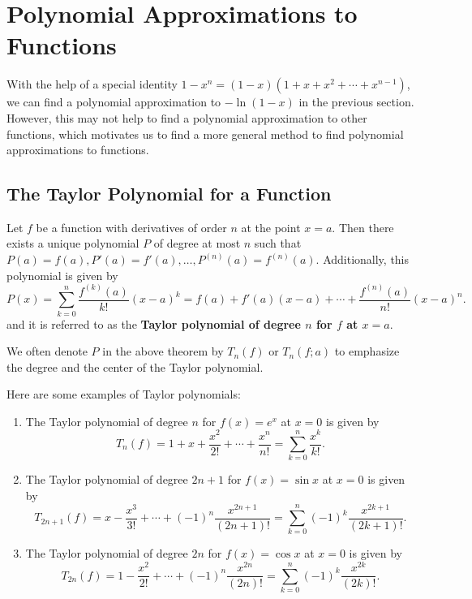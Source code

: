     \chapter{Polynomial Approximations to Functions}
    With the help of a special identity $1-x^n = (1-x)(1+x+x^2+\cdots + x^{n-1})$, we can find a polynomial approximation to $-\ln(1-x)$ in the previous section. However, this may not help to find a polynomial approximation to other functions, which motivates us to find a more general method to find polynomial approximations to functions.
    \section{The Taylor Polynomial for a Function}
    \begin{theoremenv}
        Let $f$ be a function with derivatives of order $n$ at the point $x=a$. Then there exists a unique polynomial $P$ of degree at most $n$ such that $P(a)=f(a), P'(a)=f'(a), \ldots, P^{(n)}(a) = f^{(n)}(a)$. Additionally, this polynomial is given by
        \[
        P(x) = \sum_{k=0}^n \frac{f^{(k)}(a)}{k!} (x-a)^k = f(a) + f'(a)(x-a) + \cdots + \frac{f^{(n)}(a)}{n!} (x-a)^n.
        \]
        and it is referred to as the \textbf{Taylor polynomial of degree $n$ for $f$ at $x=a$}.
    \end{theoremenv}
    \begin{notationenv}
        We often denote $P$ in the above theorem by $T_n(f)$ or $T_n(f;a)$ to emphasize the degree and the center of the Taylor polynomial.
    \end{notationenv}
    \begin{exampleenv}
        Here are some examples of Taylor polynomials:
        \begin{enumerate}[label=(\arabic*)]
            \item The Taylor polynomial of degree $n$ for $f(x)=e^x$ at $x=0$ is given by
            \[
            T_n(f) = 1 + x + \frac{x^2}{2!} + \cdots + \frac{x^n}{n!} = \sum_{k=0}^n \frac{x^k}{k!}.
            \]
            \item The Taylor polynomial of degree $2n+1$ for $f(x)=\sin x$ at $x=0$ is given by
            \[
            T_{2n+1}(f) = x - \frac{x^3}{3!} + \cdots + (-1)^n \frac{x^{2n+1}}{(2n+1)!} = \sum_{k=0}^n (-1)^k \frac{x^{2k+1}}{(2k+1)!}.
            \]
            \item The Taylor polynomial of degree $2n$ for $f(x)=\cos x$ at $x=0$ is given by
            \[
            T_{2n}(f) = 1 - \frac{x^2}{2!} + \cdots + (-1)^n \frac{x^{2n}}{(2n)!} = \sum_{k=0}^n (-1)^k \frac{x^{2k}}{(2k)!}.
            \]
        \end{enumerate}
    \end{exampleenv}

